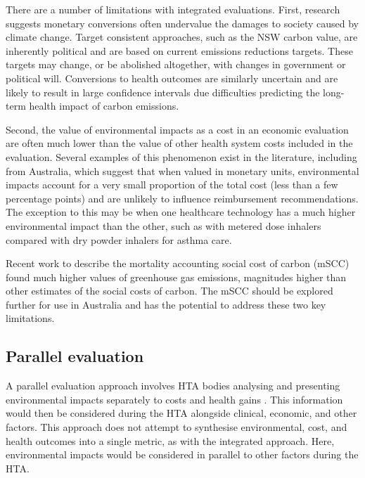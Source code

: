 \begin{refsection}
There are a number of limitations with integrated evaluations. First, research suggests monetary conversions often undervalue the damages to society caused by climate change.\cite{rennert_comprehensive_2022} Target consistent approaches, such as the NSW carbon value, are inherently political and are based on current emissions reductions targets. These targets may change, or be abolished altogether, with changes in government or political will. Conversions to health outcomes are similarly uncertain and are likely to result in large confidence intervals due difficulties predicting the long-term health impact of carbon emissions.\cite{ducrot_integrating_2025}

Second, the value of environmental impacts as a cost in an economic evaluation are often much lower than the value of other health system costs included in the evaluation. Several examples of this phenomenon exist in the literature, including from Australia, which suggest that when valued in monetary units, environmental impacts account for a very small proportion of the total cost (less than a few percentage points) and are unlikely to influence reimbursement recommendations.\cite{de_preux_beyond_2018, dunbar_balancing_2025, pugliesi_cost_2025, williams_healthcare_2025} The exception to this may be when one healthcare technology has a much higher environmental impact than the other, such as with metered dose inhalers compared with dry powder inhalers for asthma care.\cite{hensher_incorporating_2020}

Recent work to describe the mortality accounting social cost of carbon (mSCC) found much higher values of greenhouse gas emissions, magnitudes higher than other estimates of the social costs of carbon.\cite{ducrot_integrating_2025} The mSCC should be explored further for use in Australia and has the potential to address these two key limitations. 

\subsection{Parallel evaluation}
A parallel evaluation approach involves HTA bodies analysing and presenting environmental impacts separately to costs and health gains . This information would then be considered during the HTA alongside clinical, economic, and other factors.\cite{toolan_environmental_2023} This approach does not attempt to synthesise environmental, cost, and health outcomes into a single metric, as with the integrated approach. Here, environmental impacts would be considered in parallel to other factors during the HTA. 


\end{refsection}
